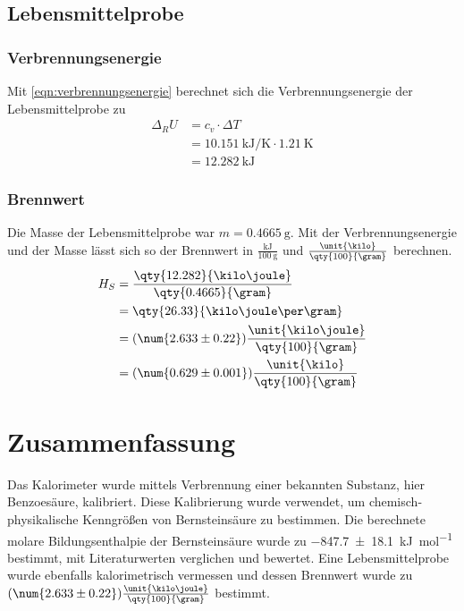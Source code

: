 \subsection{Lebensmittelprobe}
\subsubsection{Verbrennungsenergie}
Mit \autoref{eqn:verbrennungsenergie} berechnet sich die Verbrennungsenergie der Lebensmittelprobe zu
\begin{align*}
    \Delta_R U &= c_v \cdot \Delta T \\
               &= \qty{10.151}{\kilo\joule\per\kelvin} \cdot \qty{1.21}{\kelvin} \\
               &= \qty{12.282}{\kilo\joule}
\end{align*}
\subsubsection{Brennwert}
Die Masse der Lebensmittelprobe war $m = \qty{0.4665}{\gram}$.
Mit der Verbrennungsenergie und der Masse lässt sich so der Brennwert in $\frac{\unit{\kilo\joule}}{\qty{100}{\gram}}$ und $\frac{\unit{\kilo\cal}}{\qty{100}{\gram}}$ berechnen.
\begin{align*}
    H_S &= \frac{\qty{12.282}{\kilo\joule}}{\qty{0.4665}{\gram}} \\
        &= \qty{26.33}{\kilo\joule\per\gram} \\
        &= (\num{2.633 \pm 0.22}) \frac{\unit{\kilo\joule}}{\qty{100}{\gram}} \\ 
        &= (\num{0.629 \pm 0.001}) \frac{\unit{\kilo\cal}}{\qty{100}{\gram}} 
\end{align*}

\section{Zusammenfassung}
Das Kalorimeter wurde mittels Verbrennung einer bekannten Substanz, hier Benzoesäure, kalibriert.
Diese Kalibrierung wurde verwendet, um chemisch-physikalische Kenngrößen von Bernsteinsäure zu bestimmen.
Die berechnete molare Bildungsenthalpie der Bernsteinsäure wurde zu \qty{-847.7 \pm 18.1}{\kilo\joule\per\mole} bestimmt, mit Literaturwerten verglichen und bewertet.
Eine Lebensmittelprobe wurde ebenfalls kalorimetrisch vermessen und dessen Brennwert wurde zu $(\num{2.633 \pm 0.22}) \frac{\unit{\kilo\joule}}{\qty{100}{\gram}}$ bestimmt.

\newpage
\printbibliography
\newpage
\appendix


